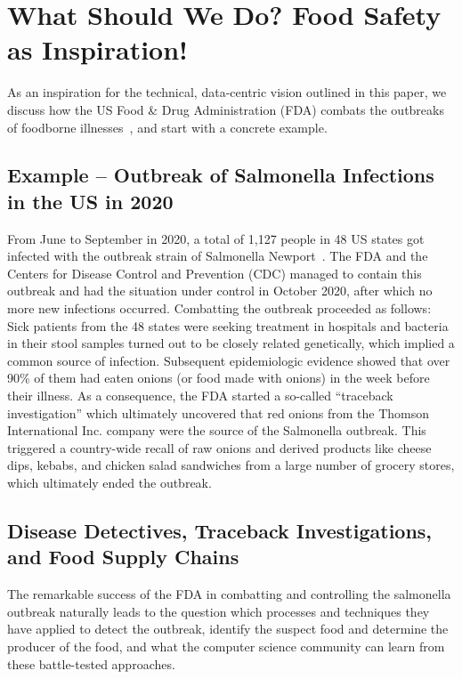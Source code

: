 \section{What Should We Do? Food Safety as Inspiration!}
\label{sec:inspiration}

As an inspiration for the technical, data-centric vision outlined in this paper, we discuss how the US Food \& Drug Administration (FDA) combats the outbreaks of foodborne illnesses~\cite{fdaout}, and start with a concrete example.

\subsection{Example -- Outbreak of Salmonella Infections in the US in 2020} 

From June to September in 2020, a total of 1,127 people in 48 US states got infected with the outbreak strain of Salmonella Newport~\cite{fdanewport}. The FDA and the Centers for Disease Control and Prevention (CDC) managed to contain this outbreak and had the situation under control in October 2020, after which no more new infections occurred. Combatting the outbreak proceeded as follows: Sick patients from the 48 states were seeking treatment in hospitals and bacteria in their stool samples turned out to be closely related genetically, which implied a common source of infection. Subsequent epidemiologic evidence showed that over 90\% of them had eaten onions (or food made with onions) in the week before their illness. As a consequence, the FDA started a so-called ``traceback investigation'' which ultimately uncovered that red onions from the Thomson International Inc. company were the source of the Salmonella outbreak. This triggered a country-wide recall of raw onions and derived products like cheese dips, kebabs, and chicken salad sandwiches from a large number of grocery stores, which ultimately ended the outbreak.



\subsection{Disease Detectives, Traceback Investigations, and Food Supply Chains}

The remarkable success of the FDA in combatting and controlling the salmonella outbreak naturally leads to the question which processes and techniques they have applied to detect the outbreak, identify the suspect food and determine the producer of the food, and what the computer science community can learn from these battle-tested approaches.


